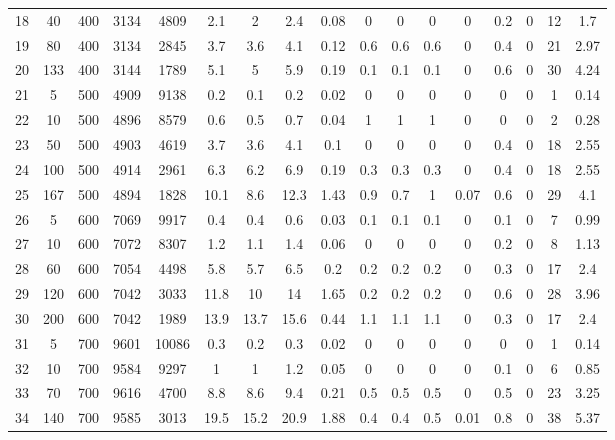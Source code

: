 \documentclass[11pt]{article}
\newcommand{\np}{\newpage}
\begin{document}
\begin{landscape}
\begin{longtable}[c]{ccccc|cccc|cccc|cccc}
		18 & 40 & 400 & 3134 & 4809 & 2.1 & 2 & 2.4 & 0.08 & 0 & 0 & 0 & 0 & 0.2 & 0 & 12 & 1.7 \\
		19 & 80 & 400 & 3134 & 2845 & 3.7 & 3.6 & 4.1 & 0.12 & 0.6 & 0.6 & 0.6 & 0 & 0.4 & 0 & 21 & 2.97 \\
		20 & 133 & 400 & 3144 & 1789 & 5.1 & 5 & 5.9 & 0.19 & 0.1 & 0.1 & 0.1 & 0 & 0.6 & 0 & 30 & 4.24 \\ \np
		\rowcolor[HTML]{EFEFEF} 
		21 & 5 & 500 & 4909 & 9138 & 0.2 & 0.1 & 0.2 & 0.02 & 0 & 0 & 0 & 0 & 0 & 0 & 1 & 0.14 \\
		\rowcolor[HTML]{EFEFEF} 
		22 & 10 & 500 & 4896 & 8579 & 0.6 & 0.5 & 0.7 & 0.04 & 1 & 1 & 1 & 0 & 0 & 0 & 2 & 0.28 \\
		\rowcolor[HTML]{EFEFEF} 
		23 & 50 & 500 & 4903 & 4619 & 3.7 & 3.6 & 4.1 & 0.1 & 0 & 0 & 0 & 0 & 0.4 & 0 & 18 & 2.55 \\
		\rowcolor[HTML]{EFEFEF} 
		24 & 100 & 500 & 4914 & 2961 & 6.3 & 6.2 & 6.9 & 0.19 & 0.3 & 0.3 & 0.3 & 0 & 0.4 & 0 & 18 & 2.55 \\
		\rowcolor[HTML]{EFEFEF} 
		25 & 167 & 500 & 4894 & 1828 & 10.1 & 8.6 & 12.3 & 1.43 & 0.9 & 0.7 & 1 & 0.07 & 0.6 & 0 & 29 & 4.1 \\
		26 & 5 & 600 & 7069 & 9917 & 0.4 & 0.4 & 0.6 & 0.03 & 0.1 & 0.1 & 0.1 & 0 & 0.1 & 0 & 7 & 0.99 \\
		27 & 10 & 600 & 7072 & 8307 & 1.2 & 1.1 & 1.4 & 0.06 & 0 & 0 & 0 & 0 & 0.2 & 0 & 8 & 1.13 \\
		28 & 60 & 600 & 7054 & 4498 & 5.8 & 5.7 & 6.5 & 0.2 & 0.2 & 0.2 & 0.2 & 0 & 0.3 & 0 & 17 & 2.4 \\
		29 & 120 & 600 & 7042 & 3033 & 11.8 & 10 & 14 & 1.65 & 0.2 & 0.2 & 0.2 & 0 & 0.6 & 0 & 28 & 3.96 \\
		30 & 200 & 600 & 7042 & 1989 & 13.9 & 13.7 & 15.6 & 0.44 & 1.1 & 1.1 & 1.1 & 0 & 0.3 & 0 & 17 & 2.4 \\
		\rowcolor[HTML]{EFEFEF} 
		31 & 5 & 700 & 9601 & 10086 & 0.3 & 0.2 & 0.3 & 0.02 & 0 & 0 & 0 & 0 & 0 & 0 & 1 & 0.14 \\
		\rowcolor[HTML]{EFEFEF} 
		32 & 10 & 700 & 9584 & 9297 & 1 & 1 & 1.2 & 0.05 & 0 & 0 & 0 & 0 & 0.1 & 0 & 6 & 0.85 \\
		\rowcolor[HTML]{EFEFEF} 
		33 & 70 & 700 & 9616 & 4700 & 8.8 & 8.6 & 9.4 & 0.21 & 0.5 & 0.5 & 0.5 & 0 & 0.5 & 0 & 23 & 3.25 \\
		\rowcolor[HTML]{EFEFEF} 
		34 & 140 & 700 & 9585 & 3013 & 19.5 & 15.2 & 20.9 & 1.88 & 0.4 & 0.4 & 0.5 & 0.01 & 0.8 & 0 & 38 & 5.37 \\

\end{longtable}
\end{landscape}
\end{document}
